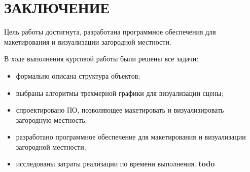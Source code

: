 \chapter*{ЗАКЛЮЧЕНИЕ}

Цель работы достигнута, разработана программное обеспечения для макетирования и визуализации загородной местности.

В ходе выполнения курсовой работы были решены все задачи:
\begin{itemize}
	\item формально описана структура объектов;
	\item выбраны алгоритмы трехмерной графики для визуализации сцены;
	\item спроектировано ПО, позволяющее макетировать и визуализировать загородную местность;
	\item разработано программное обеспечение для макетирования и визуализации загородной местности;
	\item исследованы затраты реализации по времени выполнения.
	\textbf{todo}
\end{itemize}

